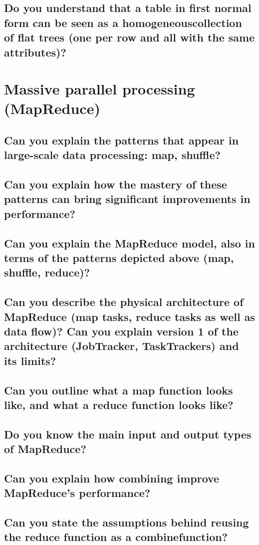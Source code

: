 \documentclass{article}
\begin{document}
\subsection{Do you understand that a table in first normal form can be seen as a homogeneouscollection of flat trees (one per row and all with the same attributes)?}

\pagebreak

\section{Massive parallel processing (MapReduce)}
\subsection{Can you explain the patterns that appear in large-scale data processing: map, shuffle?}
\subsection{Can you explain how the mastery of these patterns can bring significant improvements in performance?}
\subsection{Can you explain the MapReduce model, also in terms of the patterns depicted above (map, shuffle, reduce)?}
\subsection{Can you describe the physical architecture of MapReduce (map tasks, reduce tasks as well as data flow)? Can you explain version 1 of the architecture (JobTracker, TaskTrackers) and its limits?}
\subsection{Can you outline what a map function looks like, and what a reduce function looks like?}
\subsection{Do you know the main input and output types of MapReduce?}
\subsection{Can you explain how combining improve MapReduce's performance?}
\subsection{Can you state the assumptions behind reusing the reduce function as a combinefunction?}
\end{document}
